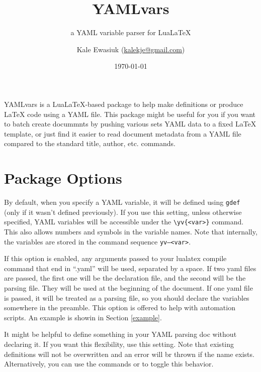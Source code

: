 \documentclass[11pt,parskip=half]{scrartcl}
\author{Kale Ewasiuk (\url{kalekje@gmail.com})}
\date{\today}
\title{YAMLvars}
\subtitle{a YAML variable parser for LuaLaTeX}
\newcommand{\llcmd}[1]{\leavevmode\llap{\texttt{\detokenize{#1}\ }}}
\newcommand{\cmd}[1]{\texttt{\detokenize{#1}}}
\begin{document}
\maketitle








YAMLvars is a LuaLaTeX-based package to help make definitions or produce LaTeX code using a YAML file.
This package might be useful for you if you want to batch create docummnts
by pushing various sets YAML data to a fixed LaTeX template,
or just find it easier to read document metadata from a YAML file compared to the
standard title, author, etc. commands.

\section{Package Options}
\leavevmode{}By default, when you specify a YAML variable, it will be defined using \texttt{gdef}
(only if it wasn't defined previously).
If you use this setting, unless otherwise specified, YAML variables will be accessible under
the \texttt{\textbackslash yv\{<var>\}} command.
This also allows numbers and symbols in the variable names.
Note that internally, the variables are stored in the command sequence
\texttt{yv--<var>}.

\leavevmode{}If this option is enabled, any arguments passed to your lualatex compile
command that end in ``.yaml'' will be used, separated by a space.
If two yaml files are passed, the first one will be the declaration file,
and the second will be the parsing file.
They will be used at the beginning of the document.
If one yaml file is passed, it will be treated as a parsing file, so you should
declare the variables somewhere in the preamble.
This option is offered to help with automation scripts.
An example is showin in Section \ref{example}.

\hspace*{3ex}\llcmd{allowundeclared}%
It might be helpful to define something in your YAML parsing doc without declaring it.
If you want this flexibility, use this setting. Note that existing definitions will not be overwritten and an error
will br thrown if the name exists. Alternatively, you can use the commands \cmd{\AllowUndeclaredYV} or \cmd{\ForbidUndeclaredYV} to toggle this behavior.
\end{document}
